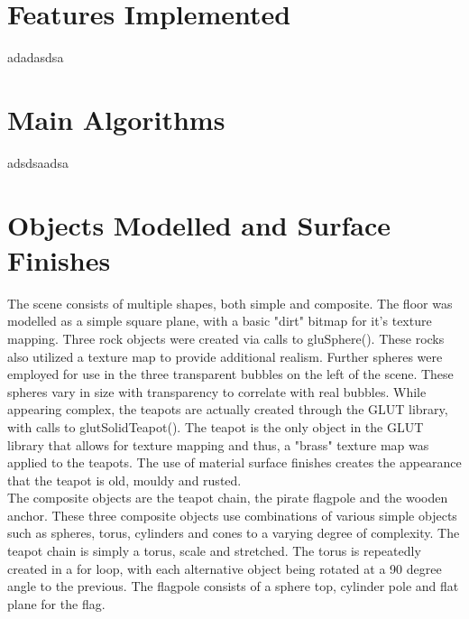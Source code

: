 \documentclass[]{article}
\begin{document}

\vspace*{0.8cm}
\section*{Features Implemented}
adadasdsa


\section*{Main Algorithms}
adsdsaadsa


\section*{Objects Modelled and Surface Finishes}

The scene consists of multiple shapes, both simple and composite. The floor was modelled as a simple square plane, with a basic "dirt" bitmap for it's texture mapping. Three rock objects were created via calls to gluSphere(). These rocks also utilized a texture map to provide additional realism. Further spheres were employed for use in the three transparent bubbles on the left of the scene. These spheres vary in size with transparency to correlate with real bubbles. While appearing complex, the teapots are actually created through the GLUT library, with calls to glutSolidTeapot(). The teapot is the only object in the GLUT library that allows for texture mapping and thus, a "brass" texture map was applied to the teapots. The use of material surface finishes creates the appearance that the teapot is old, mouldy and rusted. \\

The composite objects are the teapot chain, the pirate flagpole and the wooden anchor. These three composite objects use combinations of various simple objects such as spheres, torus, cylinders and cones to a varying degree of complexity. The teapot chain is simply a torus, scale and stretched. The torus is repeatedly created in a for loop, with each alternative object being rotated at a 90 degree angle to the previous. The flagpole consists of a sphere top, cylinder pole and flat plane for the flag.
\end{document}
